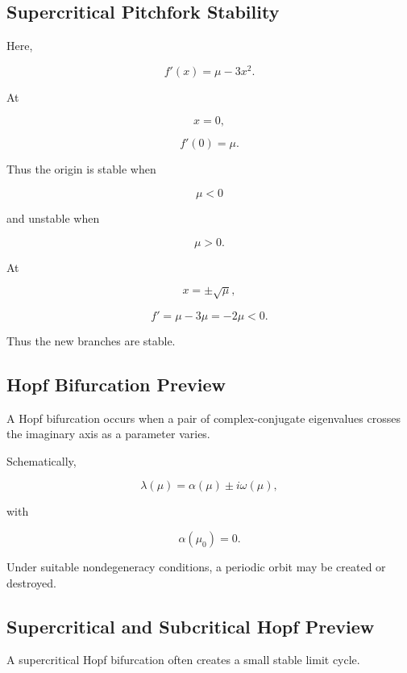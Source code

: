\subsection{Supercritical Pitchfork Stability}
\label{subsec:supercritical-pitchfork-stability}

Here,

\[
f'(x)
=
\mu-3x^2.
\]

At

\[
x=0,
\]

\[
f'(0)=\mu.
\]

Thus the origin is stable when

\[
\mu<0
\]

and unstable when

\[
\mu>0.
\]

At

\[
x=\pm\sqrt{\mu},
\]

\[
f'
=
\mu-3\mu
=
-2\mu<0.
\]

Thus the new branches are stable.

\subsection{Hopf Bifurcation Preview}
\label{subsec:hopf-bifurcation-preview}

A Hopf bifurcation occurs when a pair of complex-conjugate eigenvalues
crosses the imaginary axis as a parameter varies.

Schematically,

\[
\boxed{
\lambda(\mu)
=
\alpha(\mu)
\pm
i\omega(\mu),
}
\]

with

\[
\boxed{
\alpha(\mu_0)=0.
}
\]

Under suitable nondegeneracy conditions, a periodic orbit may be created
or destroyed.

\subsection{Supercritical and Subcritical Hopf Preview}
\label{subsec:hopf-types-preview}

A supercritical Hopf bifurcation often creates a small stable limit cycle.

